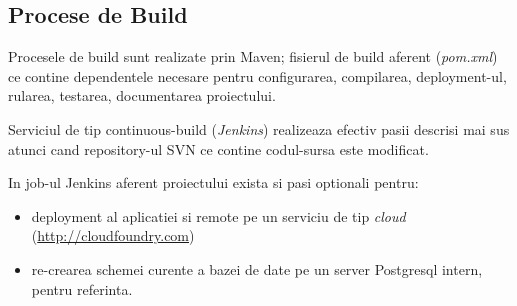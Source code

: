 \subsection{Procese de Build}
Procesele de build sunt realizate prin Maven;
fisierul de build aferent (\emph{pom.xml})
ce contine dependentele necesare pentru configurarea, compilarea,
deployment-ul, rularea, testarea, documentarea proiectului.

Serviciul de tip continuous-build (\emph{Jenkins}) 
realizeaza efectiv pasii descrisi mai sus 
atunci cand repository-ul SVN ce contine codul-sursa este modificat. 

In job-ul Jenkins aferent proiectului exista si pasi optionali pentru:
\begin{itemize}
\item
deployment al aplicatiei si remote pe un
serviciu de tip \emph{cloud} (\url{http://cloudfoundry.com}) 
\item
re-crearea schemei curente a bazei de date pe un server Postgresql intern,
pentru referinta.
\end{itemize}

